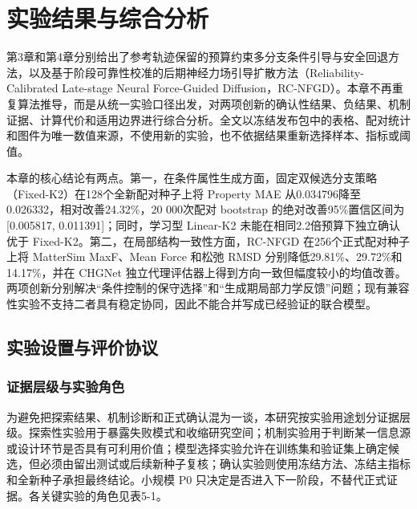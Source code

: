 \chapter{实验结果与综合分析}

第3章和第4章分别给出了参考轨迹保留的预算约束多分支条件引导与安全回退方法，以及基于阶段可靠性校准的后期神经力场引导扩散方法（Reliability-Calibrated Late-stage Neural Force-Guided Diffusion，RC-NFGD）。本章不再重复算法推导，而是从统一实验口径出发，对两项创新的确认性结果、负结果、机制证据、计算代价和适用边界进行综合分析。全文以冻结发布包中的表格、配对统计和图件为唯一数值来源，不使用新的实验，也不依据结果重新选择样本、指标或阈值。

本章的核心结论有两点。第一，在条件属性生成方面，固定双候选分支策略（Fixed-K2）在128个全新配对种子上将 Property MAE 从0.034796降至0.026332，相对改善24.32\%，20 000次配对 bootstrap 的绝对改善95\%置信区间为{[}0.005817, 0.011391{]}；同时，学习型 Linear-K2 未能在相同2.2倍预算下独立确认优于 Fixed-K2。第二，在局部结构一致性方面，RC-NFGD 在256个正式配对种子上将 Matter\allowbreak Sim MaxF、Mean Force 和松弛 RMSD 分别降低29.81\%、29.72\%和14.17\%，并在 CHGNet 独立代理评估器上得到方向一致但幅度较小的均值改善。两项创新分别解决``条件控制的保守选择''和``生成期局部力学反馈''问题；现有兼容性实验不支持二者具有稳定协同，因此不能合并写成已经验证的联合模型。

\section{实验设置与评价协议}

\subsection{证据层级与实验角色}

为避免把探索结果、机制诊断和正式确认混为一谈，本研究按实验用途划分证据层级。探索性实验用于暴露失败模式和收缩研究空间；机制实验用于判断某一信息源或设计环节是否具有可利用价值；模型选择实验允许在训练集和验证集上确定候选，但必须由留出测试或后续新种子复核；确认实验则使用冻结方法、冻结主指标和全新种子承担最终结论。小规模 P0 只决定是否进入下一阶段，不替代正式证据。各关键实验的角色见表5-1。


